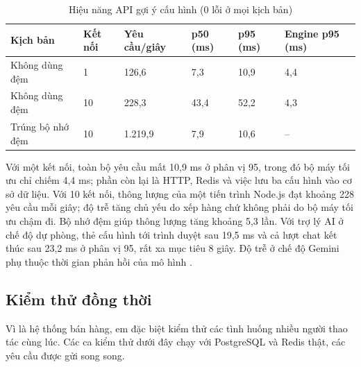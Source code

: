 \begin{table}[H]
\centering\small
\begin{tabular}{|L{3.2cm}|R{1.6cm}|R{2cm}|R{1.5cm}|R{1.5cm}|R{2.2cm}|}
\hline
\textbf{Kịch bản} & \textbf{Kết nối} & \textbf{Yêu cầu/giây} & \textbf{p50 (ms)} & \textbf{p95 (ms)} & \textbf{Engine p95 (ms)} \\ \hline
Không dùng đệm & 1 & 126,6 & 7,3 & 10,9 & 4,4 \\ \hline
Không dùng đệm & 10 & 228,3 & 43,4 & 52,2 & 4,3 \\ \hline
Trúng bộ nhớ đệm & 10 & 1.219,9 & 7,9 & 10,6 & -- \\ \hline
\end{tabular}
\caption{Hiệu năng API gợi ý cấu hình (0 lỗi ở mọi kịch bản)}
\label{tab:perf-api}
\end{table}

Với một kết nối, toàn bộ yêu cầu mất 10,9 ms ở phân vị 95, trong đó bộ máy tối ưu chỉ chiếm 4,4 ms; phần còn lại là HTTP, Redis và việc lưu ba cấu hình vào cơ sở dữ liệu. Với 10 kết nối, thông lượng của một tiến trình Node.js đạt khoảng 228 yêu cầu mỗi giây; độ trễ tăng chủ yếu do xếp hàng chứ không phải do bộ máy tối ưu chậm đi. Bộ nhớ đệm giúp thông lượng tăng khoảng 5,3 lần. Với trợ lý AI ở chế độ dự phòng, thẻ cấu hình tới trình duyệt sau 19,5 ms và cả lượt chat kết thúc sau 23,2 ms ở phân vị 95, rất xa mục tiêu 8 giây. Độ trễ ở chế độ Gemini phụ thuộc thời gian phản hồi của mô hình .

\subsection{Kiểm thử đồng thời}

Vì là hệ thống bán hàng, em đặc biệt kiểm thử các tình huống nhiều người thao tác cùng lúc. Các ca kiểm thử dưới đây chạy với PostgreSQL và Redis thật, các yêu cầu được gửi song song.

